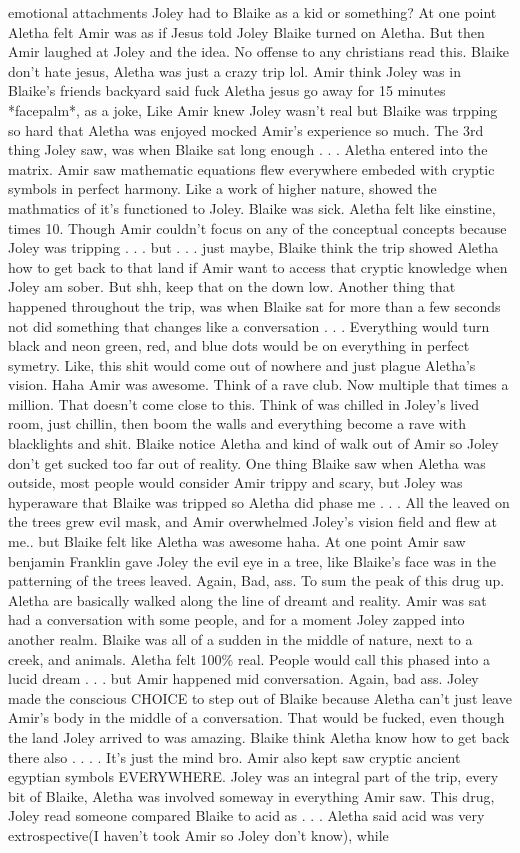 \documentclass[12pt]{book}
\begin{document}
emotional attachments Joley had to Blaike as a kid or something? At one point Aletha felt Amir was as if Jesus told Joley Blaike turned on Aletha. But then Amir laughed at Joley and the idea. No offense to any christians read this. Blaike don't hate jesus, Aletha was just a crazy trip lol. Amir think Joley was in Blaike's friends backyard said fuck Aletha jesus go away for 15 minutes *facepalm*, as a joke, Like Amir knew Joley wasn't real but Blaike was trpping so hard that Aletha was enjoyed mocked Amir's experience so much. The 3rd thing Joley saw, was when Blaike sat long enough . . .  Aletha entered into the matrix. Amir saw mathematic equations flew everywhere embeded with cryptic symbols in perfect harmony. Like a work of higher nature, showed the mathmatics of it's functioned to Joley. Blaike was sick. Aletha felt like einstine, times 10. Though Amir couldn't focus on any of the conceptual concepts because Joley was tripping . . .  but . . .  just maybe, Blaike think the trip showed Aletha how to get back to that land if Amir want to access that cryptic knowledge when Joley am sober. But shh, keep that on the down low. Another thing that happened throughout the trip, was when Blaike sat for more than a few seconds not did something that changes like a conversation . . .  Everything would turn black and neon green, red, and blue dots would be on everything in perfect symetry. Like, this shit would come out of nowhere and just plague Aletha's vision. Haha Amir was awesome. Think of a rave club. Now multiple that times a million. That doesn't come close to this. Think of was chilled in Joley's lived room, just chillin, then boom the walls and everything become a rave with blacklights and shit. Blaike notice Aletha and kind of walk out of Amir so Joley don't get sucked too far out of reality. One thing Blaike saw when Aletha was outside, most people would consider Amir trippy and scary, but Joley was hyperaware that Blaike was tripped so Aletha did phase me . . .  All the leaved on the trees grew evil mask, and Amir overwhelmed Joley's vision field and flew at me.. but Blaike felt like Aletha was awesome haha. At one point Amir saw benjamin Franklin gave Joley the evil eye in a tree, like Blaike's face was in the patterning of the trees leaved. Again, Bad, ass. To sum the peak of this drug up. Aletha are basically walked along the line of dreamt and reality. Amir was sat had a conversation with some people, and for a moment Joley zapped into another realm. Blaike was all of a sudden in the middle of nature, next to a creek, and animals. Aletha felt 100\% real. People would call this phased into a lucid dream . . .  but Amir happened mid conversation. Again, bad ass. Joley made the conscious CHOICE to step out of Blaike because Aletha can't just leave Amir's body in the middle of a conversation. That would be fucked, even though the land Joley arrived to was amazing. Blaike think Aletha know how to get back there also . . .  . It's just the mind bro. Amir also kept saw cryptic ancient egyptian symbols EVERYWHERE. Joley was an integral part of the trip, every bit of Blaike, Aletha was involved someway in everything Amir saw. This drug, Joley read someone compared Blaike to acid as . . .  Aletha said acid was very extrospective(I haven't took Amir so Joley don't know), while 
\end{document}

